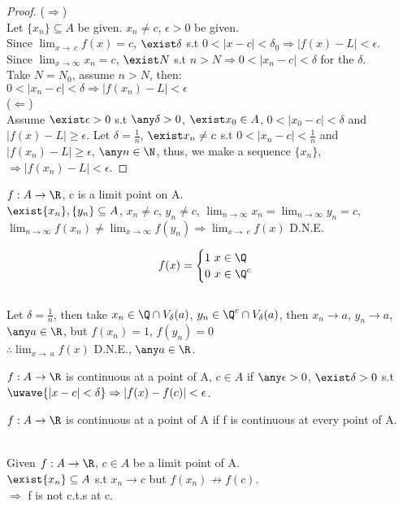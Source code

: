 \begin{proof}
    ($\Rightarrow$) \\
    Let $\{x_n\} \subseteq A$ be given. $x_n \neq c$, $\epsilon > 0$ be given. \\
    Since $\lim_{x\to\ c} f(x) = c$, $\exist \delta$ s.t $0<|x-c|<\delta_0 \Rightarrow |f(x) -L| <\epsilon$. \\
    Since $\lim_{x\to\infty} x_n = c$, $\exist N $ s.t $n>N \Rightarrow 0<|x_n -c| <\delta$ for the $\delta$. \\
    Take $N = N_0$, assume $n>N$, then:\\
    $0<|x_n-c|<\delta \Rightarrow |f(x_n) -L| <\epsilon$\\
    ($\Leftarrow$) \\
    Assume $\exist \epsilon > 0$ s.t $\any \delta >0$, $\exist x_0 \in A$, $0<|x_0 -c| < \delta$ and $|f(x)-L| \geq \epsilon$.
    Let $\delta = \frac{1}{n}$, $\exist x_n \neq c$ s.t $0<|x_n-c|<\frac{1}{n}$ and $|f(x_n) -L| \geq \epsilon$, $\any n \in \N$, thus, we make a sequence $\{x_n\}$,\\
     $\Rightarrow |f(x_n) - L| <\epsilon$.
\end{proof}
\begin{theorem}
\label{Algebraic Limit Theorem}
    $f:A \rightarrow \R$, c is a limit point on A. \\
    $\exist \{ x_n\}, \{y_n\} \subseteq A$, $x_n \neq c$, $y_n \neq c$, $\lim_{n\to\infty} x_n = \lim_{n\to\infty} y_n = c$, $\lim_{n\to\infty} f(x_n) \neq \lim_{x\to\infty} f(y_n) \Rightarrow \lim_{x\to\ c} f(x)$ D.N.E.
\end{theorem}
\begin{example}
    $$
        f(x) = 
    \begin{cases}
        \text{1 } x \in \Q \\
        \text{0 } x \in \Q^c
    \end{cases}$$ \\
    Let $\delta = \frac{1}{n}$, then take $x_n \in \Q \cap V_\delta (a)$, $y_n \in \Q^c \cap V_\delta (a)$, then $x_n \rightarrow a$, $y_n \rightarrow a$, $\any a \in \R$, but $f(x_n) =1$, $f(y_n) = 0$\\
    $\therefore \lim_{x\to\ a} f(x)$ D.N.E., $\any a \in \R$.
\end{example}
\begin{definition}
    $f:A\rightarrow\R$ is continuous at a point of A, $c \in A$ if $\any \epsilon > 0$, $\exist \delta >0$ s.t $\uwave{|x-c|<\delta }\Rightarrow |f(x)-f(c)| < \epsilon$. %
\end{definition}
\begin{definition}
    $f:A\rightarrow\R$ is continuous at a point of A if f is continuous at every point of A.
\end{definition}
 \\
Given $f: A\rightarrow \R$, $c \in A$ be a limit point of A. \\
\indent $\exist \{x_n\} \subseteq A$ s.t $x_n \rightarrow c$ but $f(x_n) \nrightarrow f(c)$. \\
$\Rightarrow$ f is not c.t.s at c.
